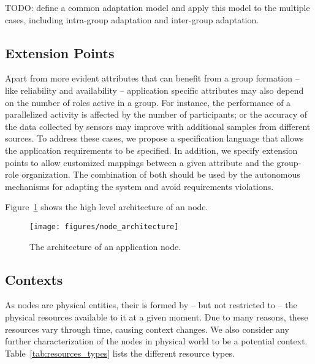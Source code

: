 TODO: define a common adaptation model and apply this model to the multiple cases, including intra-group adaptation and inter-group adaptation.

\subsection{Extension Points}

Apart from more evident attributes that can benefit from a group formation -- like reliability and availability -- application specific attributes may also depend on %
the number of roles active in a group. For instance, the performance of a parallelized activity is affected by the number of participants; or the accuracy of the data collected by sensors may improve with additional samples from different sources. To address these cases, we propose a specification language that allows the application requirements to be specified. In addition, we specify extension points to allow customized mappings between a given attribute and the group-role organization. The combination of both should be used by the autonomous mechanisms for adapting the system and avoid requirements violations.


Figure~\ref{fig:node_architecture} shows the high level architecture of an node. %

\begin{figure}[t!]
	\centering
	\texttt{[image: figures/node\_architecture]}
	\caption{The architecture of an application node.}
	\label{fig:node_architecture}
\end{figure}

%

\subsection{Contexts}


As nodes are physical entities, their is formed by -- but not restricted to -- the physical resources available to it at a given moment. Due to many reasons, these resources vary through time, causing context changes. We also consider any further characterization of the nodes in physical world to be a potential context. Table~\ref{tab:resources_types} lists the different resource types.

